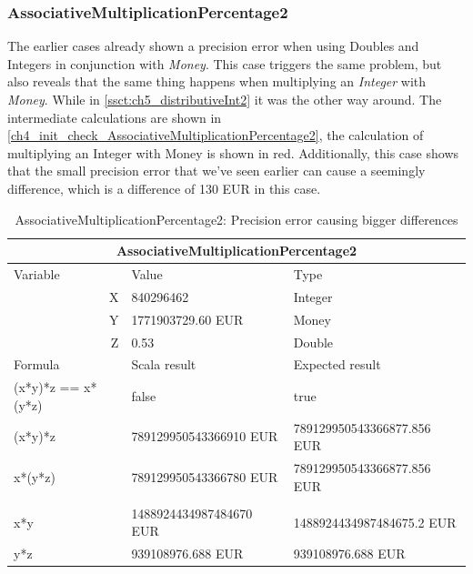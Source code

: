 \subsubsection{AssociativeMultiplicationPercentage2}
The earlier cases already shown a precision error when using Doubles and Integers in conjunction with \textit{Money}. This case triggers the same problem, but also reveals that the same thing happens when multiplying an \textit{Integer} with \textit{Money}. While in \autoref{ssct:ch5_distributiveInt2} it was the other way around. The intermediate calculations are shown in \autoref{ch4_init_check_AssociativeMultiplicationPercentage2}, the calculation of multiplying an Integer with Money is shown in red. Additionally, this case shows that the small precision error that we've seen earlier can cause a seemingly difference, which is a difference of 130 EUR in this case.
\\
\begin{table}[h!]
\centering
\begin{tabular}{lll}
\hline
\multicolumn{3}{|c|}{AssociativeMultiplicationPercentage2}                                                            \\ \hline
\multicolumn{1}{|l}{Variable}           & Value                   & \multicolumn{1}{l|}{Type}                       \\
\multicolumn{1}{|r}{X}                  & 840296462               & \multicolumn{1}{l|}{Integer}                    \\
\multicolumn{1}{|r}{Y}                  & 1771903729.60 EUR       & \multicolumn{1}{l|}{Money}                      \\
\multicolumn{1}{|r}{Z}                  & 0.53                    & \multicolumn{1}{l|}{Double}                     \\ \hline
\multicolumn{1}{|l}{Formula}            & Scala result            & \multicolumn{1}{l|}{Expected result}            \\
\multicolumn{1}{|l}{(x*y)*z == x*(y*z)} & false                   & \multicolumn{1}{l|}{true}                       \\
\multicolumn{1}{|l}{(x*y)*z}            & 789129950543366910 EUR  & \multicolumn{1}{l|}{789129950543366877.856 EUR} \\
\multicolumn{1}{|l}{x*(y*z)}            & 789129950543366780 EUR  & \multicolumn{1}{l|}{789129950543366877.856 EUR} \\
\multicolumn{1}{|l}{}                   &                         & \multicolumn{1}{l|}{}                           \\
\multicolumn{1}{|l}{x*y}                & 1488924434987484670 EUR & \multicolumn{1}{l|}{1488924434987484675.2 EUR}  \\
\multicolumn{1}{|l}{y*z}                & 939108976.688 EUR       & \multicolumn{1}{l|}{939108976.688 EUR}          \\ \hline
\end{tabular}
\caption{AssociativeMultiplicationPercentage2: Precision error causing bigger differences}
\label{ch4_init_check_AssociativeMultiplicationPercentage2}
\end{table}
\\

